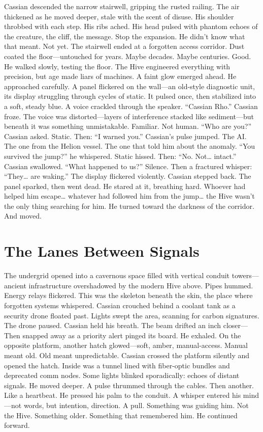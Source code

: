 \documentclass[12pt,oneside]{book}
\begin{document}
Cassian descended the narrow stairwell, gripping the rusted railing.
The air thickened as he moved deeper, stale with the scent of disuse. His shoulder throbbed with each step. His ribs ached. His head pulsed with phantom echoes of the creature, the cliff, the message.
Stop the expansion.
He didn’t know what that meant.
Not yet.
The stairwell ended at a forgotten access corridor. Dust coated the floor—untouched for years. Maybe decades. Maybe centuries.
Good.
He walked slowly, testing the floor. The Hive engineered everything with precision, but age made liars of machines.
A faint glow emerged ahead.
He approached carefully.
A panel flickered on the wall—an old-style diagnostic unit, its display struggling through cycles of static. It pulsed once, then stabilized into a soft, steady blue.
A voice crackled through the speaker.
“Cassian Rho.”
Cassian froze.
The voice was distorted—layers of interference stacked like sediment—but beneath it was something unmistakable.
Familiar.
Not human.
“Who are you?” Cassian asked.
Static.
Then:
“I warned you.”
Cassian’s pulse jumped.
The AI.
The one from the Helion vessel.
The one that told him about the anomaly.
“You survived the jump?” he whispered.
Static hissed.
Then:
“No. Not… intact.”
Cassian swallowed.
“What happened to us?”
Silence.
Then a fractured whisper:
“They… are waking.”
The display flickered violently.
Cassian stepped back.
The panel sparked, then went dead.
He stared at it, breathing hard.
Whoever had helped him escape… whatever had followed him from the jump… the Hive wasn’t the only thing searching for him.
He turned toward the darkness of the corridor.
And moved.



\chapter{The Lanes Between Signals}

The undergrid opened into a cavernous space filled with vertical conduit towers—ancient infrastructure overshadowed by the modern Hive above. Pipes hummed. Energy relays flickered. This was the skeleton beneath the skin, the place where forgotten systems whispered.
Cassian crouched behind a coolant tank as a security drone floated past. Lights swept the area, scanning for carbon signatures.
The drone paused.
Cassian held his breath.
The beam drifted an inch closer—
Then snapped away as a priority alert pinged its board.
He exhaled.
On the opposite platform, another hatch glowed—soft, amber, manual-access.
Manual meant old.
Old meant unpredictable.
Cassian crossed the platform silently and opened the hatch.
Inside was a tunnel lined with fiber-optic bundles and deprecated comm nodes. Some lights blinked sporadically: echoes of distant signals.
He moved deeper.
A pulse thrummed through the cables.
Then another.
Like a heartbeat.
He pressed his palm to the conduit.
A whisper entered his mind—not words, but intention, direction.
A pull.
Something was guiding him.
Not the Hive.
Something older.
Something that remembered him.
He continued forward.
\end{document}
